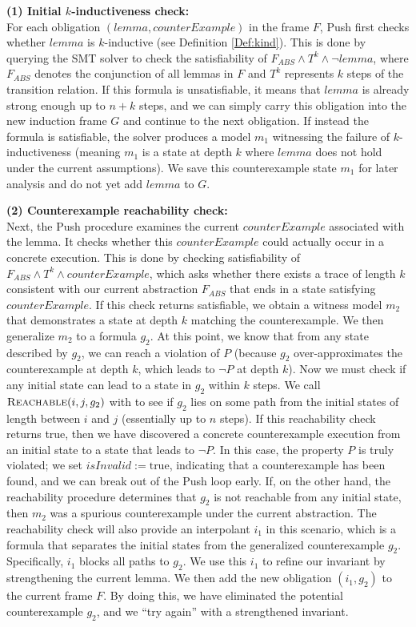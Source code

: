 \textbf{(1) Initial $k$-inductiveness check:} \\
For each obligation $(\mathit{lemma}, \mathit{counterExample})$ in the frame $F$, Push first checks
whether $\mathit{lemma}$ is $k$-inductive (see Definition \ref{Def:kind}). This is done by
querying the SMT solver to check the satisfiability of
$F_{ABS} \wedge T^k \wedge ¬lemma$, where $F_{ABS}$ denotes the
conjunction of all lemmas in $F$ 
and $T^k$ represents $k$ steps of the transition relation. If this formula is
unsatisfiable, it means that $\mathit{lemma}$ is already strong enough up to $n+k$ steps, and we can simply
carry this obligation into the new induction frame $G$ and continue to the next
obligation. If instead the formula is satisfiable, the solver produces a model
$m_1$ witnessing the failure of $k$-inductiveness (meaning $m_1$ is a state at
depth $k$ where $\mathit{lemma}$ does not hold under the current assumptions).
We save this counterexample state $m_1$ for later analysis and do not yet add
$\mathit{lemma}$ to $G$.

\textbf{(2) Counterexample reachability check:} \\
Next, the Push procedure examines the current $\mathit{counterExample}$ associated with the lemma. It
checks whether this $\mathit{counterExample}$ could actually occur in a
concrete execution. This is done by checking satisfiability of
$F_{ABS} \wedge T^k \wedge counterExample$, which asks whether there
exists a trace of length $k$ consistent with our current abstraction
$F_{ABS}$ that ends in a state satisfying $\mathit{counterExample}$. If
this check returns satisfiable, we obtain a witness model $m_2$ that
demonstrates a state at depth $k$ matching the counterexample. We then
generalize $m_2$ to a formula $g_2$. At this point, we know that from any
state described by $g_2$, we can reach a violation of $P$ (because $g_2$
over-approximates the counterexample at depth $k$, which leads to $\neg P$ at depth $k$).
Now we must check if any initial state can lead to a state in $g_2$ within $k$
steps. We call $\textsc{Reachable}(i, j, g_2)$ with to see if $g_2$ lies on some path from the initial
states of length between $i$ and $j$ (essentially up to $n$ steps). If this
reachability check returns true, then we have discovered a concrete
counterexample execution from an initial state to a state that leads to $\neg
P$. In this case, the property $P$ is truly violated; we set
$\mathit{isInvalid} := \text{true}$, indicating that a counterexample has been
found, and we can break out of the Push loop early. If, on the other hand, the
reachability procedure determines that $g_2$ is not reachable from any
initial state, then $m_2$ was a spurious counterexample under the current abstraction. 
The reachability check will also provide an interpolant  $i_1$ in this
scenario, which is a formula that separates the initial states from the
generalized counterexample $g_2$. Specifically, $i_1$ blocks all
paths to $g_2$. We use this $i_1$ to refine our invariant by
strengthening the current lemma. We then add the new obligation
$(i_1, g_2)$ to the current frame $F$. By doing this, we have eliminated the potential
counterexample $g_2$, and we “try again” with a strengthened invariant.

